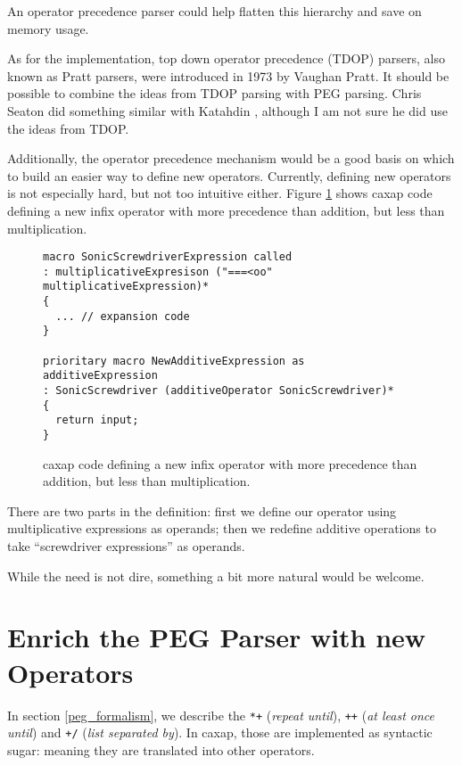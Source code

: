 An operator precedence parser could help flatten this hierarchy and save on
memory usage.

As for the implementation, top down operator precedence (TDOP) parsers, also
known as Pratt parsers, were introduced in 1973 by Vaughan Pratt.
\cite{pratt1973} It should be possible to combine the ideas from TDOP parsing
with PEG parsing. Chris Seaton did something similar with Katahdin
\cite{katahdin}, although I am not sure he did use the ideas from TDOP.

Additionally, the operator precedence mechanism would be a good basis on which
to build an easier way to define new operators. Currently, defining new
operators is not especially hard, but not too intuitive either. Figure
\ref{screwdriver} shows caxap code defining a new infix operator with more
precedence than addition, but less than multiplication.

\begin{figure}[here]
\small
\begin{lstlisting}[frame=single,language=caxap]
macro SonicScrewdriverExpression called
: multiplicativeExpresison ("===<oo" multiplicativeExpression)*
{
  ... // expansion code
}

prioritary macro NewAdditiveExpression as additiveExpression
: SonicScrewdriver (additiveOperator SonicScrewdriver)*
{
  return input;
}
\end{lstlisting}
\caption{caxap code defining a new infix operator with more precedence than
  addition, but less than multiplication.}
\label{screwdriver}
\end{figure}

There are two parts in the definition: first we define our operator using
multiplicative expressions as operands; then we redefine additive operations to
take ``screwdriver expressions'' as operands.

While the need is not dire, something a bit more natural would be welcome.

\section{Enrich the PEG Parser with new Operators}

In section \ref{peg_formalism}, we describe the \texttt{*+} (\emph{repeat
  until}), \texttt{++} (\emph{at least once until}) and \texttt{+/} (\emph{list
  separated by}). In caxap, those are implemented as syntactic sugar: meaning
they are translated into other operators.

